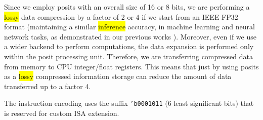 Since we employ posits with an overall size of 16 or 8 bits, we are performing a \hl{lossy} data compression by a factor of 2 or 4 if we start from an IEEE FP32 format (maintaining a similar \hl{inference} accuracy, in machine learning and neural network tasks, as demonstrated in our previous works \cite{coco_et_al_ieeespm_2020,coco2020sensors}). Moreover, even if we use a wider backend to perform computations, the data expansion is performed only within the posit processing unit. Therefore, we are transferring compressed data from memory to CPU integer/float registers. This means that just by using posits as a \hl{lossy} compressed information storage can reduce the amount of data transferred up to a factor 4.

The instruction encoding uses the suffix \texttt{'b0001011} (6 least significant bits) that is reserved for custom ISA extension.

